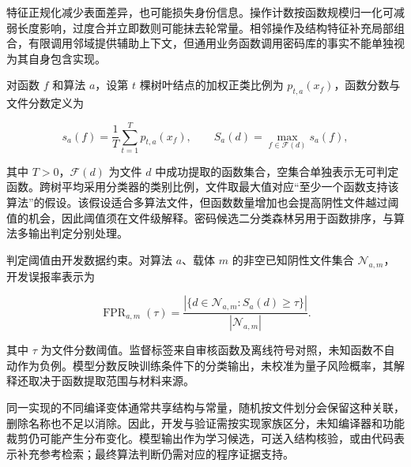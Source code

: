 特征正规化减少表面差异，也可能损失身份信息。操作计数按函数规模归一化可减弱长度影响，过度合并立即数则可能抹去轮常量。相邻操作及结构特征补充局部组合，有限调用邻域提供辅助上下文，但通用业务函数调用密码库的事实不能单独视为其自身包含实现。

对函数 $f$ 和算法 $a$，设第 $t$ 棵树叶结点的加权正类比例为 $p_{t,a}(x_f)$，函数分数与文件分数定义为

\begin{equation}
  s_a(f)=\frac{1}{T}\sum_{t=1}^{T}p_{t,a}(x_f),\qquad
  S_a(d)=\max_{f\in\mathcal F(d)}s_a(f),
  \label{eq:rf-file-score}
\end{equation}

其中 $T>0$，$\mathcal F(d)$ 为文件 $d$ 中成功提取的函数集合，空集合单独表示无可判定函数。跨树平均采用分类器的类别比例\cite{sklearn-rf17}，文件取最大值对应“至少一个函数支持该算法”的假设。该假设适合多算法文件，但函数数量增加也会提高阴性文件越过阈值的机会，因此阈值须在文件级解释。密码候选二分类森林另用于函数排序，与算法多输出判定分别处理。

判定阈值由开发数据约束。对算法 $a$、载体 $m$ 的非空已知阴性文件集合 $\mathcal N_{a,m}$，开发误报率表示为

\begin{equation}
  \operatorname{FPR}_{a,m}(\tau)=
  \frac{|\{d\in\mathcal N_{a,m}:S_a(d)\geq\tau\}|}{|\mathcal N_{a,m}|}.
  \label{eq:rf-development-fpr}
\end{equation}

其中 $\tau$ 为文件分数阈值。监督标签来自审核函数及离线符号对照，未知函数不自动作为负例。模型分数反映训练条件下的分类输出，未校准为量子风险概率，其解释还取决于函数提取范围与材料来源。

同一实现的不同编译变体通常共享结构与常量，随机按文件划分会保留这种关联，删除名称也不足以消除。因此，开发与验证需按实现家族区分，未知编译器和功能裁剪仍可能产生分布变化。模型输出作为学习候选，可送入结构核验，或由代码表示补充参考检索\cite{graphcodebert2020}；最终算法判断仍需对应的程序证据支持。



